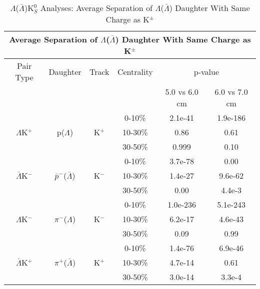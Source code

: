 \documentclass[../AnalysisNoteJBuxton.tex]{subfiles}
\begin{document}
\begin{table}
 \centering
 \begin{tabular}{|c|c|c|c|c|c|}
 \multicolumn{6}{c}{Average Separation of $\Lambda$($\bar{\Lambda}$) Daughter With Same Charge as K$^{\pm}$} \\
  \hline
  Pair Type & Daughter & Track & Centrality & \multicolumn{2}{c|}{p-value} \\
  \cline{5-6}
   & & & & 5.0 vs 6.0 cm & 6.0 vs 7.0 cm \\
  \hline
   & & & 0-10\% & 2.1e-41 & 1.9e-186 \\
  $\Lambda$K$^{+}$ & p($\Lambda$) & K$^{+}$ 
     & 10-30\% & 0.86 & 0.61 \\
   & & & 30-50\% & 0.999 & 0.10 \\
  \hline
   & & & 0-10\% & 3.7e-78 & 0.00 \\
   $\bar{\Lambda}$K$^{-}$ & $\bar{p}^{-}$($\bar{\Lambda}$) & K$^{-}$
     & 10-30\% & 1.4e-27 & 9.6e-62 \\
   & & & 30-50\% & 0.00 & 4.4e-3 \\
  \hline \hline
   & & & 0-10\% & 1.0e-236 & 5.1e-243 \\
   $\Lambda$K$^{-}$ & $\pi^{-}$($\Lambda$) & K$^{-}$ 
     & 10-30\% & 6.2e-17 & 4.6e-43 \\
   & & & 30-50\% & 0.09 & 0.99 \\
  \hline
   & & & 0-10\% & 1.4e-76 & 6.9e-46 \\
   $\bar{\Lambda}$K$^{+}$ & $\pi^{+}$($\bar{\Lambda}$) & K$^{+}$
     & 10-30\% & 4.7e-14 & 0.61 \\
   & & & 30-50\% & 3.0e-14 & 3.3e-4 \\
  \hline
 \end{tabular}
 \caption{$\Lambda$($\bar{\Lambda}$)K$^{0}_{S}$ Analyses: Average Separation of $\Lambda$($\bar{\Lambda}$) Daughter With Same Charge as K$^{\pm}$}
 \label{tab:AvgSepLamKch}
\end{table}
\end{document}
